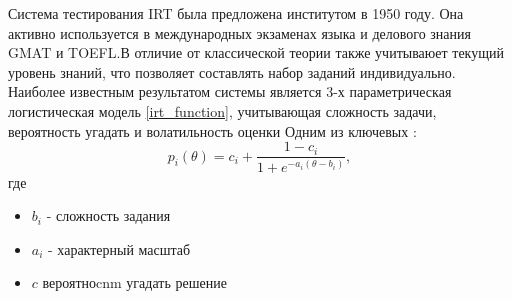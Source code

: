 Система тестирования IRT была предложена институтом в 1950 году. Она активно используется в международных экзаменах языка
и делового знания GMAT и TOEFL.В отличие от классической теории также учитываюет текущий уровень знаний, что позволяет составлять набор заданий индивидуально.
Наиболее известным результатом системы является 3-х параметрическая логистическая модель \ref{irt_function}, учитывающая сложность задачи, вероятность угадать и волатильность оценки Одним из ключевых \cite{lord1956measurement}:
\begin{equation}
    p_i(\theta) = c_i + \frac{1-c_i}{1+e^{-a_i(\theta-b_i)}},
\end{equation}
где \begin{itemize}
    \item $b_i$ - сложность задания
    \item $a_i$ - характерный масштаб
    \item $c$ вероятноcnm угадать решение
\end{itemize}

